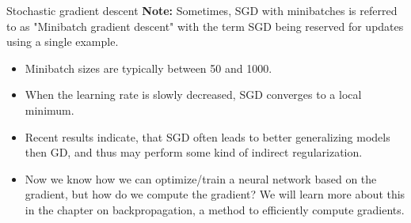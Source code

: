 \begin{vbframe}{Stochastic gradient descent}
\textbf{Note:} Sometimes, SGD with minibatches is referred to as "Minibatch gradient descent" with the term SGD being reserved for updates using a single example.

\framebreak 


\vspace*{0.5cm}
  \begin{itemize}
    \item Minibatch sizes are typically between 50 and 1000.
    \item When the learning rate is slowly decreased, SGD converges to a local minimum.
    \item Recent results indicate, that SGD often leads to better generalizing models then GD, and thus may perform some kind of indirect regularization.
    \item Now we know how we can optimize/train a neural network based on the gradient, but how do we compute the gradient? We will learn more about this in the chapter on backpropagation, a method to efficiently compute gradients.
  \end{itemize}
\end{vbframe}


\endlecture
